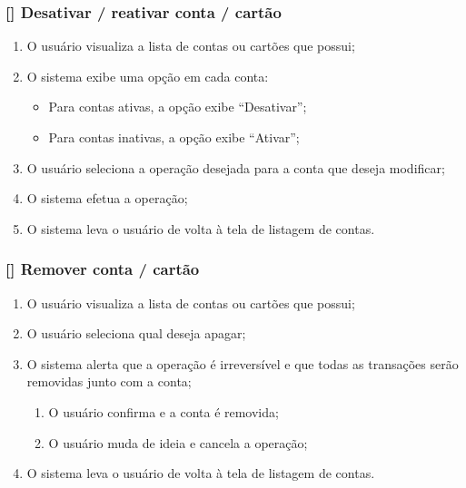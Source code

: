 \documentclass[a4paper]{abnt}
\begin{document}
\subsubsection{[\UC] Desativar / reativar conta / cartão}
\begin{enumerate}[itemsep=-1ex]
	\item O usuário visualiza a lista de contas ou cart\~oes que possui;
	\item O sistema exibe uma opç\~ao em cada conta:
	\begin{itemize}[itemsep=-1ex,topsep=-1ex]
		\item Para contas ativas, a opç\~ao exibe ``Desativar'';
		\item Para contas inativas, a opç\~ao exibe ``Ativar'';
	\end{itemize}
	\item O usuário seleciona a operaç\~ao desejada para a conta que deseja modificar;
	\item O sistema efetua a operaç\~ao;
	\item O sistema leva o usuário de volta à tela de listagem de contas.
\end{enumerate}

\subsubsection{[\UC] Remover conta / cartão}
\begin{enumerate}[itemsep=-1ex]
	\item O usuário visualiza a lista de contas ou cart\~oes que possui;
	\item O usuário seleciona qual deseja apagar;
	\item O sistema alerta que a operaç\~ao é irreversível e que todas as transaç\~oes ser\~ao removidas junto com a conta;
	\begin{enumerate}[itemsep=-1ex,topsep=-1ex]
		\item O usuário confirma e a conta é removida;
		\item O usuário muda de ideia e cancela a operaç\~ao;
	\end{enumerate}
	\item O sistema leva o usuário de volta à tela de listagem de contas.
\end{enumerate}


\pagebreak
\end{document}

